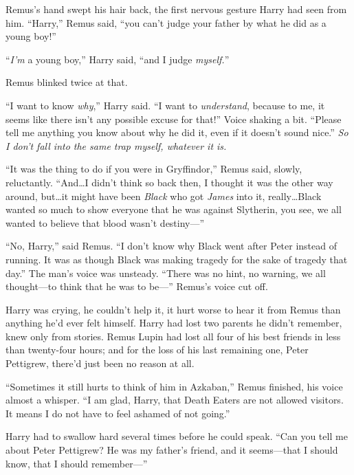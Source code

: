 Remus’s hand swept his hair back, the first nervous gesture Harry had seen from him. “Harry,” Remus said, “you can’t judge your father by what he did as a young boy!”

“\emph{I’m} a young boy,” Harry said, “and I judge \emph{myself.}”

Remus blinked twice at that.

“I want to know \emph{why},” Harry said. “I want to \emph{understand}, because to me, it seems like there isn’t any possible excuse for that!” Voice shaking a bit. “Please tell me anything you know about why he did it, even if it doesn’t sound nice.” \emph{So I don’t fall into the same trap myself, whatever it is.}

“It was the thing to do if you were in Gryffindor,” Remus said, slowly, reluctantly. “And…I didn’t think so back then, I thought it was the other way around, but…it might have been \emph{Black} who got \emph{James} into it, really…Black wanted so much to show everyone that he was against Slytherin, you see, we all wanted to believe that blood wasn’t destiny—”

\later

“No, Harry,” said Remus. “I don’t know why Black went after Peter instead of running. It was as though Black was making tragedy for the sake of tragedy that day.” The man’s voice was unsteady. “There was no hint, no warning, we all thought—to think that he was to be—” Remus’s voice cut off.

Harry was crying, he couldn’t help it, it hurt worse to hear it from Remus than anything he’d ever felt himself. Harry had lost two parents he didn’t remember, knew only from stories. Remus Lupin had lost all four of his best friends in less than twenty-four hours; and for the loss of his last remaining one, Peter Pettigrew, there’d just been no reason at all.

“Sometimes it still hurts to think of him in Azkaban,” Remus finished, his voice almost a whisper. “I am glad, Harry, that Death Eaters are not allowed visitors. It means I do not have to feel ashamed of not going.”

Harry had to swallow hard several times before he could speak. “Can you tell me about Peter Pettigrew? He was my father’s friend, and it seems—that I should know, that I should remember—”


